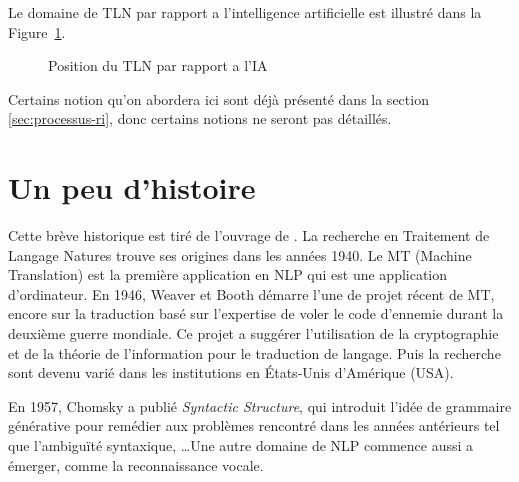 Le domaine de TLN par rapport a l'intelligence artificielle est illustré dans la Figure~\ref{fig:nlp-ref-ai}.

\begin{figure}[htbp]
    \begin{center}
    \end{center}
    \caption{Position du TLN par rapport a l'IA \citep{devopedia-nlp}}
    \label{fig:nlp-ref-ai}
\end{figure}

Certains notion qu'on abordera ici sont déjà présenté dans la section \ref{sec:processus-ri}, donc certains notions ne seront pas détaillés.

\section{Un peu d'histoire}
Cette brève historique est tiré de l'ouvrage de \citeauthor{natural-language-processing} \citep{natural-language-processing}. La recherche en Traitement de Langage Natures trouve ses origines dans les années 1940. Le MT (Machine Translation) est la première application en NLP qui est une application d'ordinateur. En 1946, Weaver et Booth démarre l'une de projet récent de MT, encore sur la traduction basé sur l'expertise de voler le code d’ennemie durant la deuxième guerre mondiale. Ce projet a suggérer l'utilisation de la cryptographie et de la théorie de l'information pour le traduction de langage. Puis la recherche sont devenu varié dans les institutions en États-Unis d'Amérique (USA).

En 1957, Chomsky a publié \textit{Syntactic Structure}, qui introduit l'idée de grammaire générative pour remédier aux problèmes rencontré dans les années antérieurs tel que l’ambiguïté syntaxique, \dots Une autre domaine de NLP commence aussi a émerger, comme la reconnaissance vocale.

